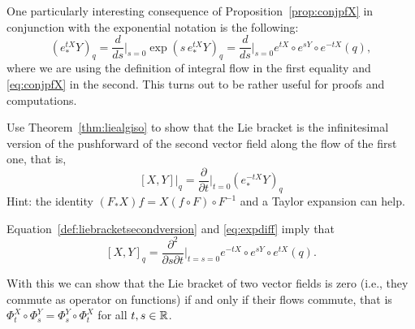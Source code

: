 \begin{remark}
  One particularly interesting consequence of Proposition~\ref{prop:conjpfX} in conjunction with the exponential notation is the following:
  \begin{equation}\label{eq:expdiff}
    \left(e_*^{tX} Y\right)_q =
    \frac{d}{ds}\Big|_{s=0} \exp\left(s\, e_*^{tX} Y\right)_q =
    \frac{d}{ds}\Big|_{s=0} e^{tX}\circ e^{sY}\circ e^{-t X}(q),
  \end{equation}
  where we are using the definition of integral flow in the first equality and \eqref{eq:conjpfX} in the second.
  This turns out to be rather useful for proofs and computations.  
\end{remark}

\begin{exercise}
  Use Theorem~\ref{thm:liealgiso} to show that the Lie bracket is the infinitesimal version of the pushforward of the second vector field along the flow of the first one, that is,
  \begin{equation}\label{def:liebracketsecondversion}
    [X,Y]\big|_q = \frac{\partial}{\partial t}\Big|_{t=0} (e_*^{-t X} Y)_q
  \end{equation}
 {\small Hint: the identity $(F_* X)f = X(f\circ F)\circ F^{-1}$ and a Taylor expansion can help.}
\end{exercise}

\begin{remark}
  Equation~\eqref{def:liebracketsecondversion} and \eqref{eq:expdiff} imply that
  \begin{equation}\label{eq:lbddr}
    [X,Y]_q = \frac{\partial^2}{\partial s \partial t}\Big|_{t=s=0}e^{-tX}\circ e^{sY}\circ e^{t X}(q).
  \end{equation}
\end{remark}

With this we can show that the Lie bracket of two vector fields is zero (i.e., they commute as operator on functions) if and only if their flows commute, that is $\Phi^X_t \circ \Phi^Y_s = \Phi^Y_s\circ \Phi^X_t$ for all $t,s\in\mathbb{R}$.

